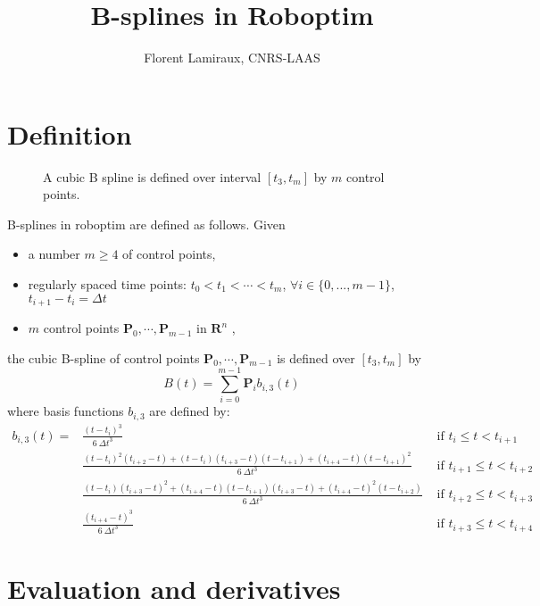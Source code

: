 \documentclass{article}
\title{B-splines in Roboptim}
\author{Florent Lamiraux, CNRS-LAAS}
\begin{document}
\maketitle
\section{Definition}
\begin{figure}[h]
\centerline{
}
\caption{A cubic B spline is defined over interval $[t_3,t_m]$ by $m$ control points.}
\end{figure}
B-splines in \textsf{roboptim} are defined as follows. Given
\begin{itemize}
      \item a number $m\geq 4$ of control points,
      \item regularly spaced time points: $t_0 < t_1 < \cdots < t_{m}$, $\forall i\in\{0,...,m-1\}$, $t_{i+1}-t_i = \Delta t$
      \item $m$ control points $ \textbf{P}_0,\cdots, \textbf{P}_{m-1}$ in $\textbf{R}^n$ ,
\end{itemize}

      the cubic B-spline of control points $\textbf{P}_0,\cdots, \textbf{P}_{m-1}$ is defined over $[t_3,t_{m}]$ by
      \begin{equation}\label{eq:def-spline}
        B(t) = \sum_{i=0}^{m-1} \textbf{P}_i b_{i,3}(t)
      \end{equation}
      where basis functions $b_{i,3}$ are defined by:
      \begin{eqnarray*}
      b_{i,3}(t)=& \frac{(t-t_i)^3}{6\ \Delta t^3} & \mbox{ if } t_{i} \leq t < t_{i+1} \\
      & \frac{(t-t_i)^2(t_{i+2}-t)+(t-t_i)(t_{i+3}-t)(t-t_{i+1})+(t_{i+4}-t)(t-t_{i+1})^2}{6\ \Delta t^3}& \mbox{ if } t_{i+1} \leq t < t_{i+2} \\
      & \frac{(t-t_i)(t_{i+3}-t)^2+(t_{i+4}-t)(t-t_{i+1})(t_{i+3}-t)+(t_{i+4}-t)^2(t-t_{i+2})}{6\ \Delta t^3}& \mbox{ if } t_{i+2} \leq t < t_{i+3} \\
      & \frac{(t_{i+4}-t)^3}{6\ \Delta t^3}& \mbox{ if } t_{i+3} \leq t < t_{i+4}
      \end{eqnarray*}

\section{Evaluation and derivatives}
\end{document}
